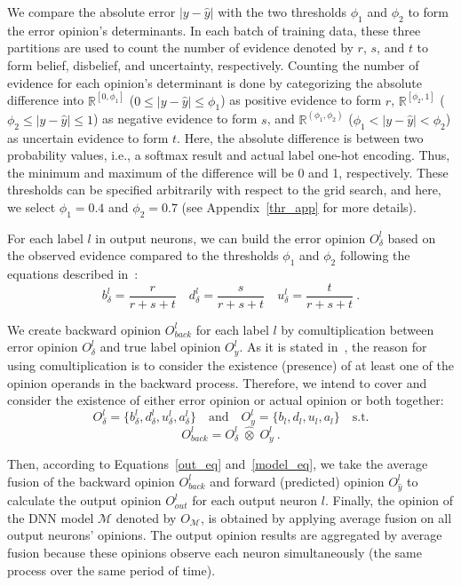 We compare the absolute error $|y-\hat{y}|$ with the two thresholds $\phi_1$ and $\phi_2$ to form the error opinion's determinants. In each batch of training data, these three partitions are used to count the number of evidence denoted by $r$, $s$, and $t$ to form belief, disbelief, and uncertainty, respectively. Counting the number of evidence for each opinion's determinant is done by categorizing the absolute difference into $\mathbb{R}^{[0,\phi_{1}]}$ ($0 \leq |y-\hat{y}| \leq \phi_1$) as positive evidence to form $r$, $\mathbb{R}^{[\phi_{2},1]}$ ($\phi_2 \leq |y-\hat{y}| \leq 1$) as negative evidence to form $s$, and $\mathbb{R}^{(\phi_{1},\phi_{2})}$ ($\phi_1 < |y-\hat{y}| < \phi_2$) as uncertain evidence to form $t$. Here, the absolute difference is between two probability values, i.e., a softmax result and actual label one-hot encoding. Thus, the minimum and maximum of the difference will be 0 and 1, respectively. These thresholds can be specified arbitrarily with respect to the grid search, and here, we select $\phi_1=0.4$ and $\phi_2=0.7$ {\color{blue}(see Appendix~\ref{thr_app} for more details)}.

For each label $l$ in output neurons, we can build the error opinion $O_{\delta}^l$ based on the observed evidence compared to the thresholds $\phi_{1}$ and $\phi_{2}$ following the equations described in~\cite{sl}:
\begin{equation}
    b_{\delta}^l = \frac{r}{r+s+t} \quad d_{\delta}^l = \frac{s}{r+s+t} \quad u_{\delta}^l = \frac{t}{r+s+t}\ .
\label{makeop}
\end{equation}

We create backward opinion $O_{back}^l$ for each label $l$ by comultiplication between error opinion $O_{\delta}^l$ and true label opinion $O_{y}^l$. {\color{blue} As it is stated in~\cite{sl}, the reason for using comultiplication is to consider the existence (presence) of at least one of the opinion operands in the backward process.} Therefore, we intend to cover and consider the existence of either error opinion or actual opinion or both together: 
\[
O_{\delta}^l = \{b_{\delta}^l,d_{\delta}^l,u_{\delta}^l,a_{\delta}^l\} \quad \text{and} \quad O_{y}^l = \{b_l,d_l,u_l,a_l\} \quad \text{s.t.}
\]
\begin{equation}
    O_{back}^l = O_{\delta}^l\; \widehat{\otimes}\; O_{y}^l\ .
\end{equation}

Then, according to Equations~\ref{out_eq} and~\ref{model_eq}, we take the average fusion of the backward opinion $O_{back}^l$ and forward (predicted) opinion $O_{\hat{y}}^l$ to calculate the output opinion $O_{out}^l$ for each output neuron $l$. Finally, the opinion of the DNN model $\mathcal{M}$ denoted by $O_{\mathcal{M}}$, is obtained by applying average fusion on all output neurons' opinions. {\color{blue} The output opinion results are aggregated by average fusion because these opinions observe each neuron simultaneously (the same process over the same period of time).} 

